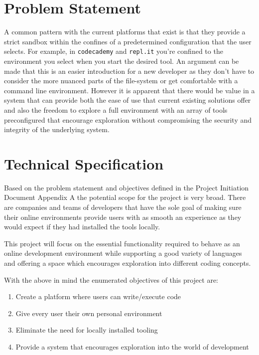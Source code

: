 \section{Problem Statement} \label{section:probart-probstate}
A common pattern with the current platforms that exist is that they provide a strict sandbox within the confines of a predetermined configuration that the user selects. For example, in \texttt{codecademy} and \texttt{repl.it} you're confined to the environment you select when you start the desired tool. An argument can be made that this is an easier introduction for a new developer as they don't have to consider the more nuanced parts of the file-system or get comfortable with a command line environment. However it is apparent that there would be value in a system that can provide both the ease of use that current existing solutions offer and also the freedom to explore a full environment with an array of tools preconfigured that encourage exploration without compromising the security and integrity of the underlying system.

\section{Technical Specification} \label{section:probart-techspec}
Based on the problem statement and objectives defined in the Project Initiation Document Appendix A the potential scope for the project is very broad. There are companies and teams of developers that have the sole goal of making sure their online environments provide users with as smooth an experience as they would expect if they had installed the tools locally.

This project will focus on the essential functionality required to behave as an online development environment while supporting a good variety of languages and offering a space which encourages exploration into different coding concepts.

With the above in mind the enumerated objectives of this project are: 
\begin{enumerate}
    \item Create a platform where users can write/execute code
    \item Give every user their own personal environment
    \item Eliminate the need for locally installed tooling
    \item Provide a system that encourages exploration into the world of development
\end{enumerate}

